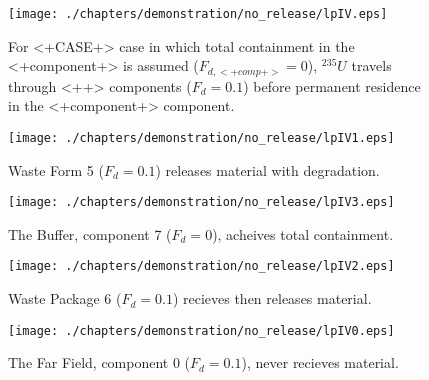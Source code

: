 \begin{figure}[ht]
\centering
\texttt{[image: ./chapters/demonstration/no\_release/lpIV.eps]}
\caption[$^{235}U$ residence. Lumped Parameter  <+Component+> No Release.]{
For <+CASE+> case in which total containment in the <+component+> is assumed 
($F_{d,<+comp+>}=0$), $^{235}U$ travels through <++> components ($F_d = 0.1$) before 
permanent residence in the <+component+> component.
}
\label{fig:lpIVall}
\begin{minipage}[b]{0.45\linewidth}

  \texttt{[image: ./chapters/demonstration/no\_release/lpIV1.eps]}
  \caption[1DIV Waste Form Contaminants.]{
    Waste Form 5 ($F_d = 0.1$) releases material with degradation. 
    }
  \label{fig:lpIVwf5}
  
  \texttt{[image: ./chapters/demonstration/no\_release/lpIV3.eps]}
  \caption[Case 1DIV Buffer Contaminants]{
    The Buffer, component 7 ($F_d=0$), acheives total containment.
    }
  \label{fig:lpIVbuff}

\end{minipage}
\hspace{0.05\linewidth}
\begin{minipage}[b]{0.45\linewidth}
  \texttt{[image: ./chapters/demonstration/no\_release/lpIV2.eps]}
  \caption[Case 1DIV Waste Package Contaminants.]{ 
    Waste Package 6 ($F_d = 0.1$) recieves then releases material. 
    }
  \label{fig:lpIVwp6}

  \texttt{[image: ./chapters/demonstration/no\_release/lpIV0.eps]}
  \caption[Case 1DIV Waste Package Contaminants.]{ 
    The Far Field, component 0 ($F_d = 0.1$), never recieves material.
    }
  \label{fig:lpIVff0}


  \end{minipage}
\end{figure}

